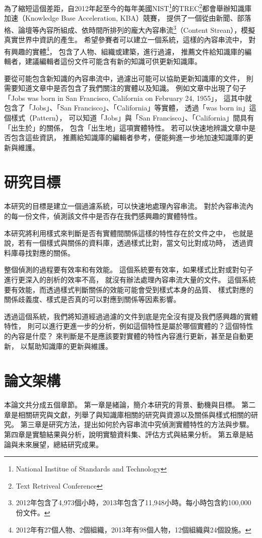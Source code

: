 為了縮短這個差距，自2012年起至今的每年美國NIST\footnote{National Institue of Standards and Technology}的TREC\footnote{Text Retriveal Conference}都會舉辦知識庫加速（Knowledge Base Acceleration, KBA）競賽，
提供了一個從由新聞、部落格、論壇等內容所組成、依時間所排列的龐大內容串流\footnote{2012年包含了4,973個小時，2013年包含了11,948小時。\citep{kba2013}每小時包含約100,000份文件。}（Content Strean），模擬真實世界中資訊的產生。
希望參賽者可以建立一個系統，這樣的內容串流中，
對有興趣的實體\footnote{2012年有27個人物、2個組織，2013年有98個人物，12個組織與24個設施。}，
包含了人物、組織或建築，進行過濾，
推薦文件給知識庫的編輯者，建議編輯者這份文件可能含有新的知識可供更新知識庫。

要從可能包含新知識的內容串流中，過濾出可能可以協助更新知識庫的文件，
則需要知道文章中是否包含了我們關注的實體以及知識。
例如文章中出現了句子「Jobs was born in San Francisco, California on February 24, 1955」，
這其中就包含了「Jobs」、「San Francisco」、「California」等實體，
透過「was born in」這個樣式（Pattern），
可以知道「Jobs」與「San Francisco」、「California」間具有「出生於」的關係，
包含「出生地」這項實體特性。
若可以快速地辨識文章中是否包含這些資訊，
推薦給知識庫的編輯者參考，便能夠進一步地加速知識庫的更新與維護。

%
%
\section{研究目標}
本研究的目標是建立一個過濾系統，可以快速地處理內容串流。
對於內容串流內的每一份文件，偵測該文件中是否存在我們感興趣的實體特性。

本研究將利用樣式來判斷是否有實體間關係這樣的特性存在於文件之中，
也就是說，若有一個樣式與關係的資料庫，透過樣式比對，當文句比對成功時，
透過資料庫尋找對應的關係。

整個偵測的過程要有效率和有效能。
這個系統要有效率，如果樣式比對或對句子進行更深入的剖析的效率不高，
就沒有辦法處理內容串流大量的文件。
這個系統要有效能，而透過樣式判斷關係的效能可能會受到樣式本身的品質、
樣式對應的關係歧義度、樣式是否真的可以對應到關係等因素影響。

透過這個系統，我們將知道經過過濾的文件到底是完全沒有提及我們感興趣的實體特性，
則可以進行更進一步的分析，例如這個特性是屬於哪個實體的？這個特性的內容是什麼？
來判斷是不是應該要對實體的特性內容進行更新，甚至是自動更新，
以幫助知識庫的更新與維護。

%
%
\section{論文架構}
本論文共分成五個章節。
第一章是緒論，簡介本研究的背景、動機與目標。
第二章是相關研究與文獻，列舉了與知識庫相關的研究與資源以及關係與樣式相關的研究。
第三章是研究方法，提出如何於內容串流中究偵測實體特性的方法與步驟。
第四章是實驗結果與分析，說明實驗資料集、評估方式與結果分析。
第五章是結論與未來展望，總結研究成果。

